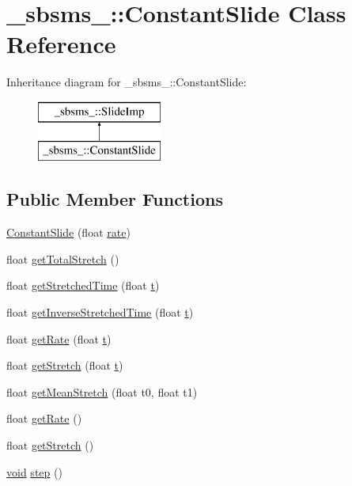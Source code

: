 \hypertarget{class__sbsms___1_1_constant_slide}{}\section{\+\_\+sbsms\+\_\+\+:\+:Constant\+Slide Class Reference}
\label{class__sbsms___1_1_constant_slide}
Inheritance diagram for \+\_\+sbsms\+\_\+\+:\+:Constant\+Slide\+:\begin{figure}[H]
\begin{center}
\leavevmode
\includegraphics[height=2.000000cm]{class__sbsms___1_1_constant_slide}
\end{center}
\end{figure}
\subsection*{Public Member Functions}
\begin{DoxyCompactItemize}
\item 
\hyperlink{class__sbsms___1_1_constant_slide_a02e9a7aa7223e23c132116de95d0f91b}{Constant\+Slide} (float \hyperlink{class__sbsms___1_1_constant_slide_a38ce93594d95228efc3e6a4bd829adb7}{rate})
\item 
float \hyperlink{class__sbsms___1_1_constant_slide_ac594c1a8ade6645a79d6f3a2563a824e}{get\+Total\+Stretch} ()
\item 
float \hyperlink{class__sbsms___1_1_constant_slide_a37dc2fd2735805d593f027448695911c}{get\+Stretched\+Time} (float \hyperlink{octave__test_8m_aaccc9105df5383111407fd5b41255e23}{t})
\item 
float \hyperlink{class__sbsms___1_1_constant_slide_a8989c598ed93bb541f54e479148774f4}{get\+Inverse\+Stretched\+Time} (float \hyperlink{octave__test_8m_aaccc9105df5383111407fd5b41255e23}{t})
\item 
float \hyperlink{class__sbsms___1_1_constant_slide_ae7ae1a4cc0f7379b6f4bb0f625f75487}{get\+Rate} (float \hyperlink{octave__test_8m_aaccc9105df5383111407fd5b41255e23}{t})
\item 
float \hyperlink{class__sbsms___1_1_constant_slide_ac33afa828c099d45c0785e2dc246099d}{get\+Stretch} (float \hyperlink{octave__test_8m_aaccc9105df5383111407fd5b41255e23}{t})
\item 
float \hyperlink{class__sbsms___1_1_constant_slide_ae913ae263702397c5a4d63f2ca1f9b47}{get\+Mean\+Stretch} (float t0, float t1)
\item 
float \hyperlink{class__sbsms___1_1_constant_slide_a3aeb6fae1cd79facea571cdde76d13ea}{get\+Rate} ()
\item 
float \hyperlink{class__sbsms___1_1_constant_slide_a74d94359065e4ed8f01ac9d13b4af74f}{get\+Stretch} ()
\item 
\hyperlink{sound_8c_ae35f5844602719cf66324f4de2a658b3}{void} \hyperlink{class__sbsms___1_1_constant_slide_a9a203673576afeb5cdbe32c6a88893ff}{step} ()
\end{DoxyCompactItemize}
